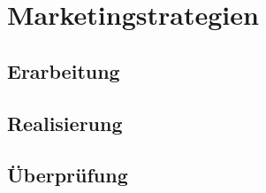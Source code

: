 \section{Marketingstrategien}
\label{sec:strategien}

\subsection{Erarbeitung}

\subsection{Realisierung}

\subsection{Überprüfung}
